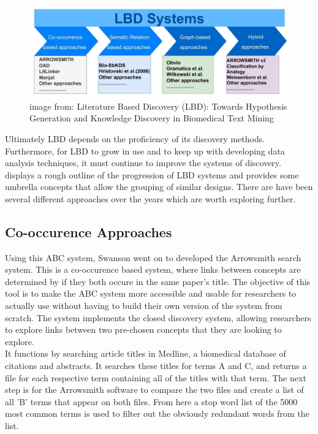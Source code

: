 \documentclass{l4proj}
\begin{document}
\begin{figure}[h]
    \centering
    \includegraphics[width=\linewidth]{images/lbd_discovery_methods.png}
    \caption{image from: Literature Based Discovery (LBD): Towards Hypothesis Generation and Knowledge Discovery in Biomedical Text Mining}
    \label{fig:discovery_methods}
\end{figure}

Ultimately LBD depends on the proficiency of its discovery methods. Furthermore, for LBD to grow in use and to keep up with developing data analysis techniques, it must continue to improve the systems of discovery.  displays a rough outline of the progression of LBD systems and provides some umbrella concepts that allow the grouping of similar designs. There are have been several different approaches over the years which are worth exploring further. \\

\subsection{Co-occurence Approaches}

Using this ABC system, Swanson went on to developed the Arrowsmith search system. This is a co-occurence based system, where links between concepts are determined by if they both occure in the same paper's title. The objective of this tool is to make the ABC system more accessible and usable for researchers to actually use without having to build their own version of the system from scratch. The system implements the closed discovery system, allowing researchers to explore links between two pre-chosen concepts that they are looking to explore. \\

It functions by searching article titles in Medline, a biomedical database of citations and abstracts. It searches these titles for terms A and C, and returns a file for each respective term containing all of the titles with that term. The next step is for the Arrowsmith software to compare the two files and create a list of all 'B' terms that appear on both files. From here a stop word list of the 5000 most common terms is used to filter out the obviously redundant words from the list. \\
\end{document}
